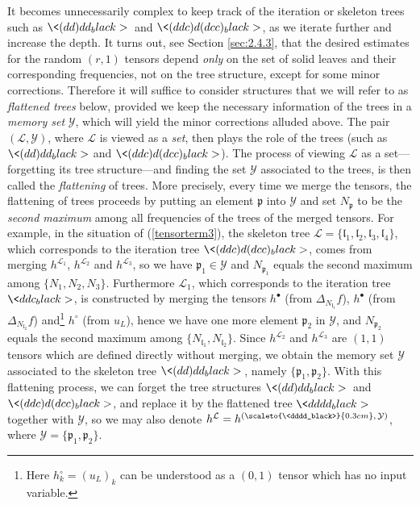 \documentclass[11 pt,reqno]{amsart}
\theoremstyle{definition}
\theoremstyle{remark}
\numberwithin{equation}{section}
\newcommand{\Lc}{\mathcal{L}}
\newcommand{\Yc}{\mathcal{Y}}
\newcommand{\pf}{\mathfrak{p}}
\newcommand{\lf}{\mathfrak{l}}
\begin{document}
{ It becomes unnecessarily complex to keep track of the iteration or skeleton trees such as $\<(dd)dd_black>\,$ and $\<(ddc)d(dcc)_black>$, as we iterate further and increase the depth. It turns out, see Section \ref{sec:2.4.3}, that the desired estimates for the random $(r,1)$ tensors depend \emph{only} on the set of solid leaves and their corresponding frequencies, not on the tree structure, except for some minor corrections. Therefore it will suffice to consider structures that we will refer to as {\emph{flattened trees}} below, provided we keep the necessary information of the trees in a \emph{memory set} $\Yc$, which will yield the minor corrections alluded above. The pair $(\Lc, \Yc)$, where $\Lc$ is viewed as a \emph{set}, then plays the role of the trees (such as $\<(dd)dd_black>$ and $\<(ddc)d(dcc)_black>$). The process of viewing $\Lc$ as a set---forgetting its tree structure---and finding the set $\Yc$ associated to the trees, is then called the \emph{flattening} of trees. More precisely, every time we merge the tensors, the flattening of trees proceeds by putting an element $\pf$ into $\Yc$ and set $N_\pf$ to be the \emph{second maximum} among  all frequencies of the trees of the merged tensors. 
For example, in the situation of (\ref{tensorterm3}), the skeleton tree $\Lc = \{\lf_1,\lf_2,\lf_3,\lf_4\}$, which corresponds to the iteration tree $\<(ddc)d(dcc)_black>$, comes from merging $h^{\Lc_1}$, $h^{\Lc_2}$ and $h^{\Lc_3}$, so we have $\pf_1\in \Yc$ and $N_{\pf_1}$ equals the second maximum  among  $\{N_1, N_2, N_3\}$. Furthermore $\Lc_1$, which corresponds to the iteration tree $\<ddc_black>$, is constructed by merging the tensors $h^{\bullet}$ (from $\Delta_{N_{\lf_1}} f$), $h^{\bullet}$ (from $\Delta_{N_{\lf_2}} f$) and\footnote{Here $h^{\circ}_{k}=(u_L)_k$ can be understood as a $(0,1)$ tensor which has no input variable.} $h^{\circ}$ (from $u_L$), hence we have one more element $\pf_2$ in $\Yc$, and $N_{\pf_2}$  equals the second maximum  among  $\{N_{\lf_1}, N_{\lf_2}\}$. Since $h^{\Lc_2}$ and $h^{\Lc_3}$ are $(1,1)$ tensors which are defined directly without merging, we obtain the memory set $\Yc$ associated to the skeleton tree $\<(dd)dd_black>\,$, namely $\{\pf_1, \pf_2\}$. With this flattening process, we can forget the tree structures $\<(dd)dd_black>\,$ and $\<(ddc)d(dcc)_black>$, and replace it by the flattened tree $\<dddd_black>$ together with $\Yc$, so we may also denote $h^{\Lc}=h^{(\scaleto{\<dddd_black>}{0.3cm},\,\Yc)}$, where $\Yc=\{\pf_1,\pf_2\}$. 

}
\end{document}
